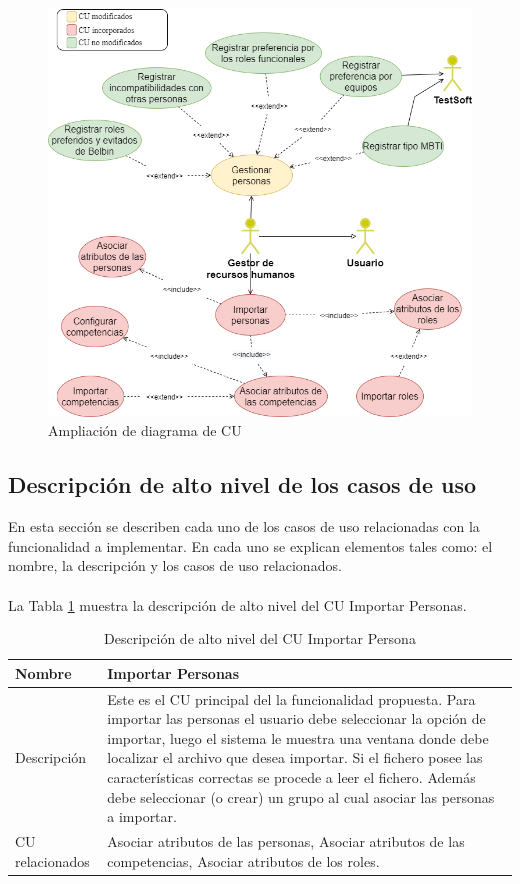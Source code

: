\begin{figure}[H]
	\centering
	\includegraphics[width=\textwidth]{figuras/diagrama_CUTeamSoftImportar.png}
	\caption{Ampliación de diagrama de CU} \label{fig:CU_nuevo}
\end{figure}
	
\subsection{Descripción de alto nivel de los casos de uso}
En esta sección se describen cada uno de los casos de uso relacionadas con la funcionalidad a implementar. En cada uno se explican elementos tales como: el nombre, la descripción y los casos de uso relacionados.\\\\

La Tabla \ref{table:descripcion-alto-nivel-importar} muestra la descripción de alto nivel del CU Importar Personas.

\begin{table}[H]
	\centering
	\caption{Descripción de alto nivel del CU Importar Persona} \label{table:descripcion-alto-nivel-importar}
	\begin{tabular}{ | l | p{10cm} |}
		\toprule
		Nombre & Importar Personas \\ \midrule
		Descripción & Este es el CU principal del la funcionalidad propuesta. Para importar las personas el usuario debe seleccionar la opción de importar, luego el sistema le muestra una ventana donde debe localizar el archivo que desea importar. Si el fichero posee las características correctas se procede a leer el fichero. Además debe seleccionar (o crear) un grupo al cual asociar las personas a importar.\\ \hline
		CU relacionados & Asociar atributos de las personas, Asociar atributos de las competencias, Asociar atributos de los roles.\\ \bottomrule
	\end{tabular}
\end{table}

